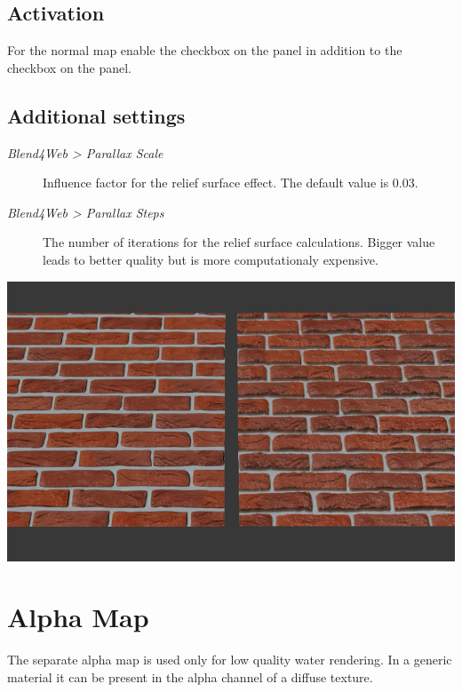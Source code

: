 \documentclass[a4paper,12pt,oneside]{sphinxmanual}
\begin{document}
\subsection{Activation}
\label{textures:id10}
For the normal map enable the  checkbox on the  panel in addition to the  checkbox on the  panel.


\subsection{Additional settings}
\label{textures:id11}\begin{description}
\item[{\emph{Blend4Web \textgreater{} Parallax Scale}}] \leavevmode
Influence factor for the relief surface effect. The default value is 0.03.

\item[{\emph{Blend4Web \textgreater{} Parallax Steps}}] \leavevmode
The number of iterations for the relief surface calculations. Bigger value leads to better quality but is more computationaly expensive.

\end{description}

{\hfill\includegraphics[width=1.000\linewidth]{parallax.jpg}\hfill}

\begin{DUlineblock}{0em}
\item[] 
\end{DUlineblock}


\section{Alpha Map}
\label{textures:alpha-map}\label{textures:texture-alpha-map}\label{textures:index-8}
The separate alpha map is used only for low quality water rendering. In a generic material it can be present in the alpha channel of a diffuse texture.
\end{document}
